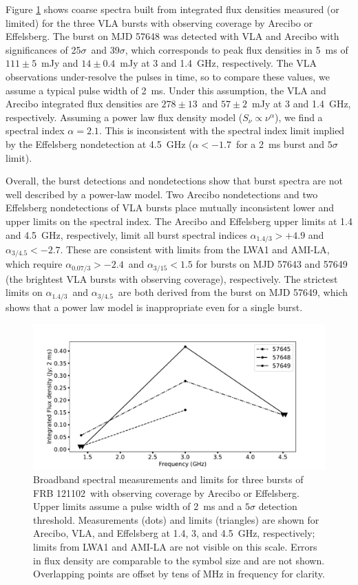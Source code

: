 \documentclass[twocolumn]{aastex61}
\newcommand{\frb}{FRB 121102}
\begin{document}
Figure \ref{fig:multi} shows coarse spectra built from integrated flux densities measured (or limited) for the three VLA bursts with observing coverage by Arecibo or Effelsberg. The burst on MJD 57648 was detected with VLA and Arecibo with significances of 25$\sigma$\ and 39$\sigma$, which corresponds to peak flux densities in 5~ms of $111\pm5$\ mJy and $14\pm0.4$\ mJy at 3 and 1.4~GHz, respectively. The VLA observations under-resolve the pulses in time, so to compare these values, we assume a typical pulse width of 2~ms. Under this assumption, the VLA and Arecibo integrated flux densities are $278\pm13$\ and $57\pm2$\ mJy at 3 and 1.4~GHz, respectively. Assuming a power law flux density model ($S_{\nu} \propto \nu^{\alpha}$), we find a spectral index $\alpha=2.1$. This is inconsistent with the spectral index limit implied by the Effelsberg nondetection at 4.5~GHz ($\alpha<-1.7$\ for a 2~ms burst and $5\sigma$ limit).

Overall, the burst detections and nondetections show that burst spectra are not well described by a power-law model. Two Arecibo nondetections and two Effelsberg nondetections of VLA bursts place mutually inconsistent lower and upper limits on the spectral index. The Arecibo and Effelsberg upper limits at 1.4 and 4.5~GHz, respectively, limit all burst spectral indices $\alpha_{1.4/3}>+4.9$ and $\alpha_{3/4.5}<-2.7$. These are consistent with limits from the LWA1 and AMI-LA, which require $\alpha_{0.07/3}>-2.4$\ and $\alpha_{3/15}<1.5$ for bursts on MJD 57643 and 57649 (the brightest VLA bursts with observing coverage), respectively. The strictest limits on $\alpha_{1.4/3}$\ and $\alpha_{3/4.5}$\ are both derived from the burst on MJD 57649, which shows that a power law model is inappropriate even for a single burst.

\begin{figure}[htb]
\begin{center}
 \includegraphics[width=\columnwidth]{multispec.pdf}
 \caption{Broadband spectral measurements and limits for three bursts of \frb\ with observing coverage by Arecibo or Effelsberg. Upper limits assume a pulse width of 2~ms and a $5\sigma$ detection threshold. Measurements (dots) and limits (triangles) are shown for Arecibo, VLA, and Effelsberg at 1.4, 3, and 4.5~GHz, respectively; limits from LWA1 and AMI-LA are not visible on this scale. Errors in flux density are comparable to the symbol size and are not shown. Overlapping points are offset by tens of MHz in frequency for clarity.
 \label{fig:multi}}
\end{center}
\end{figure}
\end{document}
